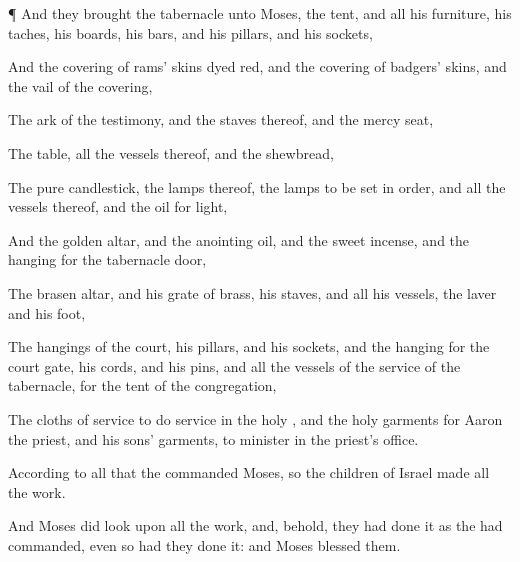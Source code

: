 {\par }{\PP {}¶ And they
brought the
tabernacle unto
Moses, the
tent, and all his
furniture, his
taches, his
boards, his
bars, and his
pillars, and his
sockets,

And the
covering of
rams’
skins dyed
red, and the
covering of
badgers’
skins, and the
vail of the
covering,

The
ark of the
testimony, and the
staves thereof, and the mercy
seat,

The
table,
{} all the
vessels thereof, and the
shewbread,

The
pure
candlestick,
{} the
lamps thereof,
{} the
lamps to be set in
order, and all the
vessels thereof, and the
oil for
light,

And the
golden
altar, and the
anointing
oil, and the
sweet
incense, and the
hanging for the
tabernacle
door,

The
brasen
altar, and his
grate of
brass, his
staves, and all his
vessels, the
laver and his
foot,

The
hangings of the
court, his
pillars, and his
sockets, and the
hanging for the
court
gate, his
cords, and his
pins, and all the
vessels of the
service of the
tabernacle, for the
tent of the
congregation,

The
cloths of
service to do
service in the
holy
{}, and the
holy
garments for
Aaron the
priest, and his
sons’
garments, to minister in the
priest’s office.

According to all that the
{}
commanded
Moses, so the
children of
Israel
made all the
work.

And
Moses did
look upon
all the
work, and, behold, they had
done it as the
{} had
commanded, even so had they
done it: and
Moses
blessed them.




\par }
